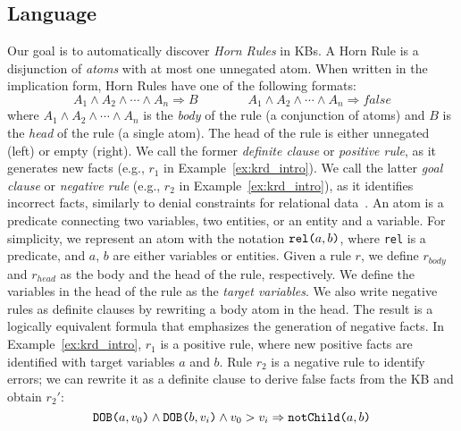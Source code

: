 \subsection{Language} \label{sec:krd_language} 
\vspace{-0.2ex}
Our goal is to automatically discover 
\emph{Horn Rules} in KBs. A Horn Rule is a disjunction of \emph{atoms} with at most one unnegated atom. When written in the implication form, Horn Rules have one of the following formats:
%
\begin{equation*}
	A_1 \wedge A_2 \wedge \cdots \wedge A_n \Rightarrow B \qquad \qquad A_1 \wedge A_2 \wedge \cdots \wedge A_n \Rightarrow  false 
\end{equation*} %
%
where $A_1 \wedge A_2 \wedge \cdots \wedge A_n$ is the \emph{body} of the rule (a conjunction of atoms) and $B$ is the \emph{head} of the rule (a single atom). The head of the rule is either unnegated (left) or empty (right). We call the former \emph{definite clause} or \emph{positive rule}, as it generates new 
facts (e.g., $r_1$ in Example~\ref{ex:krd_intro}). We call the latter \emph{goal clause} or \emph{negative rule} (e.g., $r_2$ in Example~\ref{ex:krd_intro}), as it identifies incorrect facts, similarly to denial constraints for relational data~\cite{chu2013discovering}. %
An atom is a predicate connecting two variables, two entities, or an entity and a variable. For simplicity, we represent an atom with the notation $\texttt{rel(}a,b\texttt{)}$, where \texttt{rel} is a predicate, and $a$, $b$ are either variables or entities. 
Given a rule $r$, we define $r_{body}$ and $r_{head}$ as the body and the head of the rule, respectively. We define the variables in the head of the rule as the \emph{target variables}. 
We also write negative rules as definite clauses by rewriting a body atom %
in the head. The result is a logically equivalent formula that emphasizes the generation of negative facts.
In Example~\ref{ex:krd_intro}, $r_1$ is a positive rule, where new positive facts are identified with target variables $a$ and $b$.
Rule $r_2$ is a negative rule to identify errors; we can rewrite it as a definite clause to derive false facts from the KB and obtain $r_2'$:
\begin{equation*}
	\texttt{DOB(}a,v_0\texttt{)} \wedge \texttt{DOB(}b,v_i\texttt{)} \wedge v_0 > v_i \Rightarrow  \texttt{notChild(}a,b\texttt{)}  
\end{equation*} 
